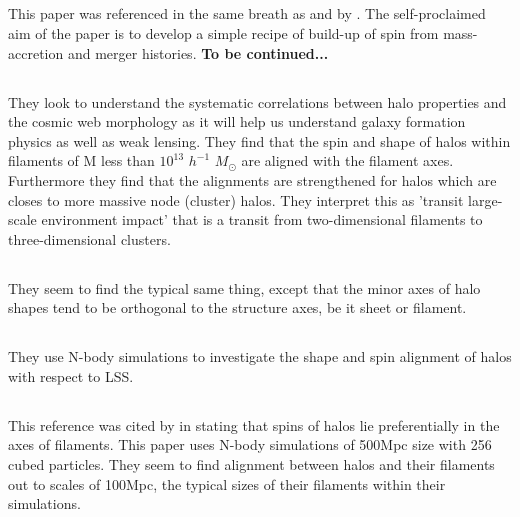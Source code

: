 \documentclass[fleqn,usenatbib]{mnras}
\begin{document}
\subsection{\citet{Maller_02}}
This paper was referenced in the same breath as \citet{Gardner_01} and \citet{Vitvitska02} by \citet{Trowland_13}.
The self-proclaimed aim of the paper is to develop a simple recipe of build-up of spin from mass-accretion and merger histories. \textbf{To be continued...}

\subsection{\citet{Zhang_09}}
They look to understand the systematic correlations between halo properties and the cosmic web morphology as it will help us understand galaxy formation physics as well as weak lensing. 
They find that the spin and shape of halos within filaments of M less than $10^{13}$ $h^{-1}$ \(M_\odot\) are aligned with the filament axes. Furthermore they find that the alignments are strengthened for halos which are closes to more massive node (cluster) halos. They interpret this as 'transit large-scale environment impact' that is a transit from two-dimensional filaments to three-dimensional clusters.

\subsection{\citet{Calvo_07b}}
They seem to find the typical same thing, except that the minor axes of halo shapes tend to be orthogonal to the structure axes, be it sheet or filament.

\subsection{\citet{Hahn_07a}}
They use N-body simulations to investigate the shape and spin alignment of halos with respect to LSS. 

\subsection{\citet{Faltenbacher_02}}
This reference was cited by \citet{Trowland_13} in stating that spins of halos lie preferentially in the axes of filaments. 
This paper uses N-body simulations of 500Mpc size with 256 cubed particles.
They seem to find alignment between halos and their filaments out to scales of 100Mpc, the typical sizes of their filaments within their simulations.
\end{document}
